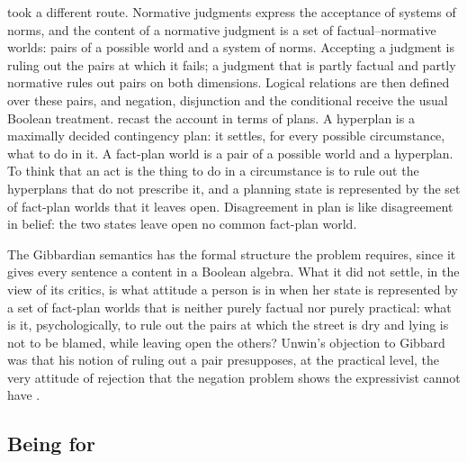 \documentclass{situationist-preprint}
\begin{document}
\citet{Gibbard1990} took a different route. Normative judgments express the acceptance of systems of norms, and the content of a normative judgment is a set of factual--normative worlds: pairs of a possible world and a system of norms. Accepting a judgment is ruling out the pairs at which it fails; a judgment that is partly factual and partly normative rules out pairs on both dimensions. Logical relations are then defined over these pairs, and negation, disjunction and the conditional receive the usual Boolean treatment. \citet{Gibbard2003} recast the account in terms of plans. A hyperplan is a maximally decided contingency plan: it settles, for every possible circumstance, what to do in it. A fact-plan world is a pair of a possible world and a hyperplan. To think that an act is the thing to do in a circumstance is to rule out the hyperplans that do not prescribe it, and a planning state is represented by the set of fact-plan worlds that it leaves open. Disagreement in plan is like disagreement in belief: the two states leave open no common fact-plan world.

The Gibbardian semantics has the formal structure the problem requires, since it gives every sentence a content in a Boolean algebra. What it did not settle, in the view of its critics, is what attitude a person is in when her state is represented by a set of fact-plan worlds that is neither purely factual nor purely practical: what is it, psychologically, to rule out the pairs at which the street is dry and lying is not to be blamed, while leaving open the others? Unwin's objection to Gibbard was that his notion of ruling out a pair presupposes, at the practical level, the very attitude of rejection that the negation problem shows the expressivist cannot have \citep{Unwin2001}.

\subsection{Being for}
\end{document}
